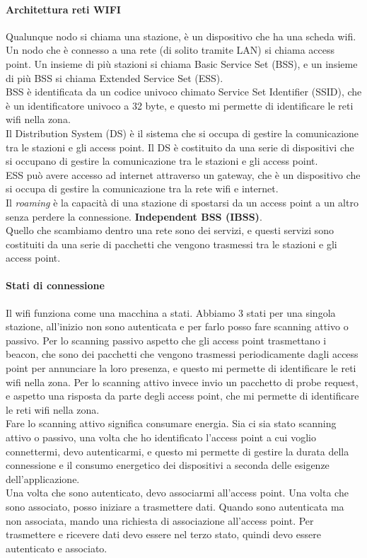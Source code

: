 \paragraph{Architettura reti WIFI}
Qualunque nodo si chiama una stazione, è un dispositivo che ha una scheda wifi. Un nodo che è connesso a una rete (di solito tramite LAN) si chiama access point. Un insieme di più stazioni si chiama Basic Service Set (BSS), e un insieme di più BSS si chiama Extended Service Set (ESS).\\
BSS è identificata da un codice univoco chimato Service Set Identifier (SSID), che è un identificatore univoco a 32 byte, e questo mi permette di identificare le reti wifi nella zona.\\
Il Distribution System (DS) è il sistema che si occupa di gestire la comunicazione tra le stazioni e gli access point. Il DS è costituito da una serie di dispositivi che si occupano di gestire la comunicazione tra le stazioni e gli access point.\\
ESS può avere accesso ad internet attraverso un gateway, che è un dispositivo che si occupa di gestire la comunicazione tra la rete wifi e internet.\\
Il \textit{roaming} è la capacità di una stazione di spostarsi da un access point a un altro senza perdere la connessione.
\textbf{Independent BSS (IBSS)}.\\

Quello che scambiamo dentro una rete sono dei servizi, e questi servizi sono costituiti da una serie di pacchetti che vengono trasmessi tra le stazioni e gli access point.

\paragraph{Stati di connessione}
Il wifi funziona come una macchina a stati. Abbiamo 3 stati per una singola stazione, all'inizio non sono autenticata e per farlo posso fare scanning attivo o passivo. Per lo scanning passivo aspetto che gli access point trasmettano i beacon, che sono dei pacchetti che vengono trasmessi periodicamente dagli access point per annunciare la loro presenza, e questo mi permette di identificare le reti wifi nella zona. Per lo scanning attivo invece invio un pacchetto di probe request, e aspetto una risposta da parte degli access point, che mi permette di identificare le reti wifi nella zona.\\
Fare lo scanning attivo significa consumare energia. Sia ci sia stato scanning attivo o passivo, una volta che ho identificato l'access point a cui voglio connettermi, devo autenticarmi, e questo mi permette di gestire la durata della connessione e il consumo energetico dei dispositivi a seconda delle esigenze dell'applicazione.\\
Una volta che sono autenticato, devo associarmi all'access point. Una volta che sono associato, posso iniziare a trasmettere dati. Quando sono autenticata ma non associata, mando una richiesta di associazione all'access point. Per trasmettere e ricevere dati devo essere nel terzo stato, quindi devo essere autenticato e associato.\\
